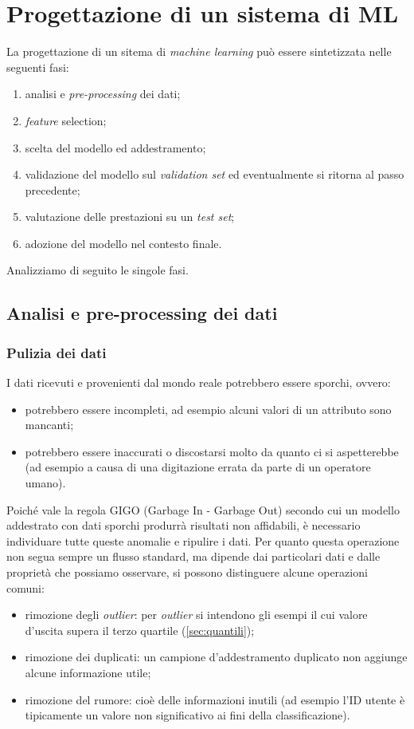 \section{Progettazione di un sistema di ML}

La progettazione di un sitema di \emph{machine learning} può essere sintetizzata nelle seguenti fasi:
\begin{enumerate}
\item analisi e \emph{pre-processing} dei dati;
\item \emph{feature} selection;
\item scelta del modello ed addestramento;
\item validazione del modello sul \emph{validation set} ed eventualmente si ritorna al passo precedente;
\item valutazione delle prestazioni su un \emph{test set};
\item adozione del modello nel contesto finale.
\end{enumerate}
Analizziamo di seguito le singole fasi.

\subsection{Analisi e pre-processing dei dati}
\subsubsection{Pulizia dei dati}
I dati ricevuti e provenienti dal mondo reale potrebbero essere sporchi, ovvero:
\begin{itemize}
\item potrebbero essere incompleti, ad esempio alcuni valori di un attributo sono mancanti;
\item potrebbero essere inaccurati o discostarsi molto da quanto ci si aspetterebbe (ad esempio a causa di una digitazione errata da parte di un operatore umano).
\end{itemize}
Poiché vale la regola GIGO (Garbage In - Garbage Out) secondo cui un modello addestrato con dati sporchi produrrà risultati non affidabili, è necessario individuare tutte queste anomalie e ripulire i dati. Per quanto questa operazione non segua sempre un flusso standard, ma dipende dai particolari dati e dalle proprietà che possiamo osservare, si possono distinguere alcune operazioni comuni:
\begin{itemize}
\item rimozione degli \emph{outlier}: per \emph{outlier} si intendono gli esempi il cui valore d'uscita supera il terzo quartile (\autoref{sec:quantili});
\item rimozione dei duplicati: un campione d'addestramento duplicato non aggiunge alcune informazione utile;
\item rimozione del rumore: cioè delle informazioni inutili (ad esempio l'ID utente è tipicamente un valore non significativo ai fini della classificazione).
\end{itemize}

